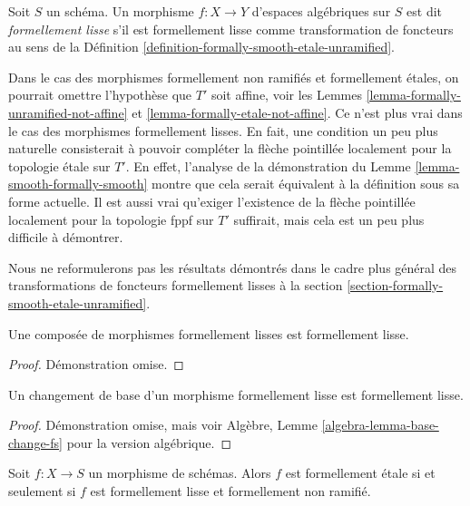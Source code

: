 \begin{definition}
\label{definition-formally-smooth}
Soit $S$ un schéma. Un morphisme $f : X \to Y$ d'espaces algébriques sur $S$
est dit {\it formellement lisse} s'il est formellement lisse comme
transformation de foncteurs au sens de la
Définition \ref{definition-formally-smooth-etale-unramified}.
\end{definition}

\noindent
Dans le cas des morphismes formellement non ramifiés et formellement étales,
on pourrait omettre l'hypothèse que $T'$ soit affine, voir les
Lemmes \ref{lemma-formally-unramified-not-affine} et
\ref{lemma-formally-etale-not-affine}.
Ce n'est plus vrai dans le cas des morphismes formellement lisses.
En fait, une condition un peu plus naturelle consisterait à pouvoir
compléter la flèche pointillée localement pour la topologie étale sur $T'$.
En effet, l'analyse de la démonstration du
Lemme \ref{lemma-smooth-formally-smooth}
montre que cela serait équivalent à la définition sous sa forme
actuelle. Il est aussi vrai qu'exiger l'existence de la flèche
pointillée localement pour la topologie fppf sur $T'$ suffirait, mais cela est un peu
plus difficile à démontrer.

\medskip\noindent
Nous ne reformulerons pas les résultats démontrés dans le cadre plus général des
transformations de foncteurs formellement lisses à la
section \ref{section-formally-smooth-etale-unramified}.

\begin{lemma}
\label{lemma-composition-formally-smooth}
Une composée de morphismes formellement lisses est formellement lisse.
\end{lemma}

\begin{proof}
Démonstration omise.
\end{proof}

\begin{lemma}
\label{lemma-base-change-formally-smooth}
Un changement de base d'un morphisme formellement lisse est formellement lisse.
\end{lemma}

\begin{proof}
Démonstration omise, mais voir
Algèbre, Lemme \ref{algebra-lemma-base-change-fs}
pour la version algébrique.
\end{proof}

\begin{lemma}
\label{lemma-formally-etale-unramified-smooth}
Soit $f : X \to S$ un morphisme de schémas.
Alors $f$ est formellement étale si et seulement si
$f$ est formellement lisse et formellement non ramifié.
\end{lemma}


